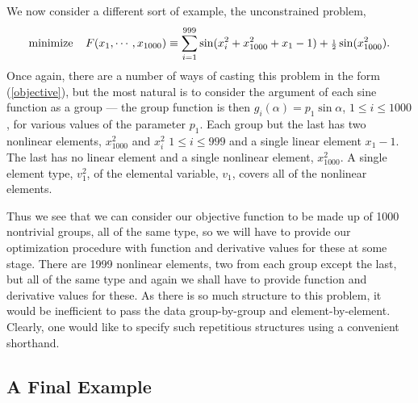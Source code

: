 \documentclass[a4paper]{article}
\newcommand{\beqn}[1]{\begin{equation}\label{#1}}
\newcommand{\eeqn}{\end{equation}}
\newcommand{\req}[1]{(\ref{#1})}
\newcommand{\ms}{\;\;\;\;}
\newcommand{\sfrac}[2]{{\scriptstyle \frac{#1}{#2}}}
\newcommand{\half}{\sfrac{1}{2}}
\begin{document}
We   now  consider a different   sort   of example, the  unconstrained
problem,
\beqn{1.5.1}
{\rm minimize} \ms  F(x_1,\cdots,x_{1000})
\equiv \sum_{i = 1}^{999} \sin(x_i^2 + x_{1000}^2 + x_1 - 1)
        + \half \sin(x_{1000}^2).
\eeqn
Once again, there are a number of ways of  casting this problem in the
form \req{objective}, but the most natural is to consider the argument
of each sine function as a group --- the group  function
is  then $g_i
(\alpha ) =  p_1 \sin \alpha  $, $1 \leq  i \leq   1000$,  for various
values of  the parameter
$p_1$.  Each  group but  the   last  has two
nonlinear elements, $x_{1000}^2$ and $x_i^2$ $1 \leq i \leq 999$ and a
single linear element $x_1 - 1$.  The last has no linear element and a
single  nonlinear  element, $x_{1000}^2$.     A single   element type,
$v_1^2$, of the elemental variable,
$v_1$, covers all of the nonlinear elements.

Thus we see that we can consider our  objective function
to be made up of 1000 nontrivial  groups, all of  the same type,
so we
will have to  provide  our optimization  procedure  with function  and
derivative values
for these at some stage.  There  are 1999 nonlinear elements,
two from
each group
except the last,  but all of the  same  type and again we shall have to
provide function and derivative
values for these.  As there is so  much  structure
to this problem, it
would  be    inefficient   to  pass   the  data   group-by-group   and
element-by-element.   Clearly,  one   would  like to    specify   such
repetitious structures using a convenient shorthand.

\subsection{\label{S1.6}A Final Example}
\end{document}
